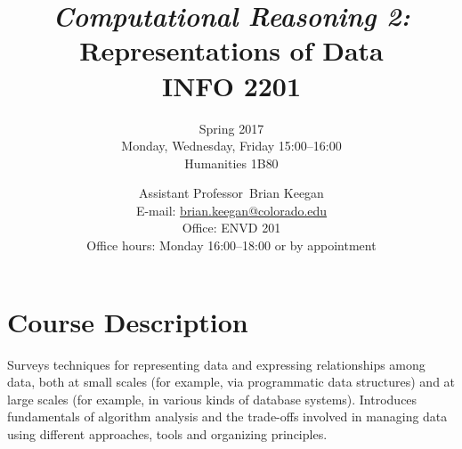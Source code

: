 \documentclass[10pt]{memoir}
\makeatletter
\def\myauthor{Brian Keegan}
\def\mycoursename{Computational Reasoning 2}
\def\mycourselisting{INFO 2201}
\def\myoffice{ENVD 201}
\def\myclassroom{Humanities 1B80}
\def\mymeetingtime{Monday, Wednesday, Friday 15:00--16:00}
\def\mydate{Spring 2017}
\def\myemail{brian.keegan@colorado.edu}
\def\myofficehours{Monday 16:00--18:00 or by appointment}
\def\mytitle{Assistant Professor}
\makeatother
\begin{document}
\nobibliography*


\title{
    \textit{\normalsize{\textcolor{CUGold}{\textbf{\mycoursename:}}}}\\
    \textbf{\huge{Representations of Data}}\\
    \vspace{5pt} \normalsize{\mycourselisting}
    }

\author{\mydate\\ \mymeetingtime\\ \myclassroom}

\date{\normalsize{\mytitle~\myauthor\\
       E-mail: \href{mailto:\myemail}{\myemail}\\
       Office: \myoffice\\
       Office hours: \myofficehours}}

\maketitle


\section{\textbf{Course Description}}


Surveys techniques for representing data and expressing relationships among data, both at small scales (for example, via programmatic data structures) and at large scales (for example, in various kinds of database systems). Introduces fundamentals of algorithm analysis and the trade-offs involved in managing data using different approaches, tools and organizing principles.
\end{document}
